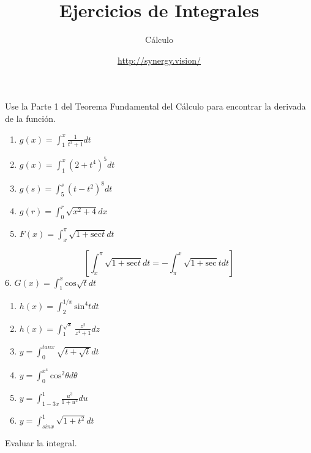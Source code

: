 \documentclass[12pt,]{article}
\title{Ejercicios de Integrales}
\subtitle{Cálculo}
\author{\url{http://synergy.vision/}}
\date{}
\begin{document}
\maketitle

{
\setcounter{tocdepth}{4}
\tableofcontents
}
\newpage

Use la Parte 1 del Teorema Fundamental del Cálculo para encontrar la
derivada de la función.

\begin{enumerate}
\def\labelenumi{\arabic{enumi}.}
\item
  \(g(x)=\displaystyle\int_{1}^{x}\frac{1}{t^3+1}dt\)
\item
  \(g(x)=\displaystyle\int_{1}^{x}(2+t^4)^5dt\)
\item
  \(g(s)=\displaystyle\int_{5}^{s}(t-t^2)^8dt\)
\item
  \(g(r)=\displaystyle\int_{0}^{r}\sqrt{x^2+4}dx\)
\item
  \(F(x)=\displaystyle\int_{x}^{\pi}\sqrt{1+\text{sec}t}dt\)
\end{enumerate}

\[\left[\displaystyle\int_{x}^{\pi}\sqrt{1+\text{sec}t}dt=-\displaystyle\int_{\pi}^{x} \sqrt{1+\text{sec}}tdt\right]\]
6. \(G(x)=\displaystyle\int_{1}^{x}\text{cos}\sqrt{t}dt\)

\begin{enumerate}
\def\labelenumi{\arabic{enumi}.}
\setcounter{enumi}{6}
\item
  \(h(x)=\displaystyle\int_{2}^{1/x}\text{sin}^4tdt\)
\item
  \(h(x)=\displaystyle\int_{1}^{\sqrt{x}}\frac{z^2}{z^4+1}dz\)
\item
  \(y=\displaystyle\int_{0}^{tanx}\sqrt{t+\sqrt{t}}dt\)
\item
  \(y=\displaystyle\int_{0}^{x^4}\text{cos}^2\theta d\theta\)
\item
  \(y=\displaystyle\int_{1-3x}^{1}\frac{u^3}{1+u^2}du\)
\item
  \(y=\displaystyle\int_{sinx}^{1}\sqrt{1+t^2}dt\)
\end{enumerate}

Evaluar la integral.
\end{document}
